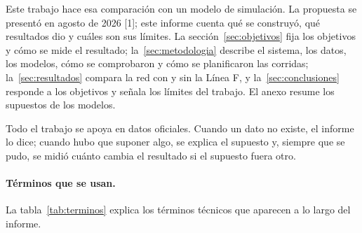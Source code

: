 \documentclass{article}
\begin{document}
Este trabajo hace esa comparación con un modelo de simulación. La propuesta se presentó en agosto de 2026
[1]; este informe cuenta qué se construyó, qué resultados dio y cuáles son sus límites. La
sección~\ref{sec:objetivos} fija los objetivos y cómo se mide el resultado; la~\ref{sec:metodologia}
describe el sistema, los datos, los modelos, cómo se comprobaron y cómo se planificaron las corridas; la~\ref{sec:resultados}
compara la red con y sin la Línea F, y la~\ref{sec:conclusiones} responde a los objetivos y señala los límites del
trabajo. El anexo resume los supuestos de los modelos.

Todo el trabajo se apoya en datos oficiales. Cuando un dato no existe, el informe lo dice; cuando hubo que
suponer algo, se explica el supuesto y, siempre que se pudo, se midió cuánto cambia el resultado si el
supuesto fuera otro.

\paragraph{Términos que se usan.} La tabla~\ref{tab:terminos} explica los términos técnicos que aparecen a lo
largo del informe.
\end{document}
